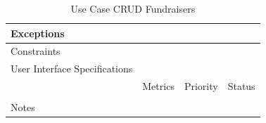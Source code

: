 \begin{table}[H]
\begin{tabularx}{\linewidth}{|l|X|X|X|}
            \hline Exceptions                    & \multicolumn{3}{l|}{}                                                                                 \\

            \hline Constraints                   & \multicolumn{3}{l|}{}                                                                                 \\

            \hline User Interface Specifications & \multicolumn{3}{l|}{}                                                                                 \\

            \hline \multirow{2}{*}{}             & Metrics                                                                           & Priority & Status \\
            \cline{2-4}                          &                                                                                   &          &        \\
            \hline Notes                         & \multicolumn{3}{l|}{}                                                                                 \\
            \hline
      \end{tabularx}
      \caption{Use Case CRUD Fundraisers}
      \label{tab:use_case_fundraisers_crud}
\end{table}




